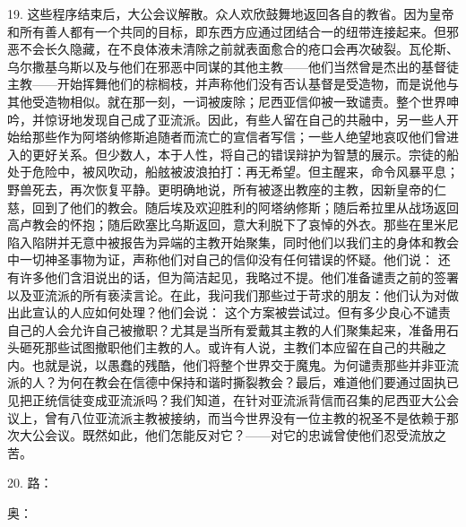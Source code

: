 19. 这些程序结束后，大公会议解散。众人欢欣鼓舞地返回各自的教省。因为皇帝和所有善人都有一个共同的目标，即东西方应通过团结合一的纽带连接起来。但邪恶不会长久隐藏，在不良体液未清除之前就表面愈合的疮口会再次破裂。瓦伦斯、乌尔撒基乌斯以及与他们在邪恶中同谋的其他主教——他们当然曾是杰出的基督徒主教——开始挥舞他们的棕榈枝，并声称他们没有否认基督是受造物，而是说他与其他受造物相似。就在那一刻，一词被废除；尼西亚信仰被一致谴责。整个世界呻吟，并惊讶地发现自己成了亚流派。因此，有些人留在自己的共融中，另一些人开始给那些作为阿塔纳修斯追随者而流亡的宣信者写信；一些人绝望地哀叹他们曾进入的更好关系。但少数人，本于人性，将自己的错误辩护为智慧的展示。宗徒的船处于危险中，被风吹动，船舷被波浪拍打：再无希望。但主醒来，命令风暴平息；野兽死去，再次恢复平静。更明确地说，所有被逐出教座的主教，因新皇帝的仁慈，回到了他们的教会。随后埃及欢迎胜利的阿塔纳修斯；随后希拉里从战场返回高卢教会的怀抱；随后欧塞比乌斯返回，意大利脱下了哀悼的外衣。那些在里米尼陷入陷阱并无意中被报告为异端的主教开始聚集，同时他们以我们主的身体和教会中一切神圣事物为证，声称他们对自己的信仰没有任何错误的怀疑。他们说： 还有许多他们含泪说出的话，但为简洁起见，我略过不提。他们准备谴责之前的签署以及亚流派的所有亵渎言论。在此，我问我们那些过于苛求的朋友：他们认为对做出此宣认的人应如何处理？他们会说： 这个方案被尝试过。但有多少良心不谴责自己的人会允许自己被撤职？尤其是当所有爱戴其主教的人们聚集起来，准备用石头砸死那些试图撤职他们主教的人。或许有人说，主教们本应留在自己的共融之内。也就是说，以愚蠢的残酷，他们将整个世界交于魔鬼。为何谴责那些并非亚流派的人？为何在教会在信德中保持和谐时撕裂教会？最后，难道他们要通过固执已见把正统信徒变成亚流派吗？我们知道，在针对亚流派背信而召集的尼西亚大公会议上，曾有八位亚流派主教被接纳，而当今世界没有一位主教的祝圣不是依赖于那次大公会议。既然如此，他们怎能反对它？——对它的忠诚曾使他们忍受流放之苦。\par

20. 路：\par

奥：\par

